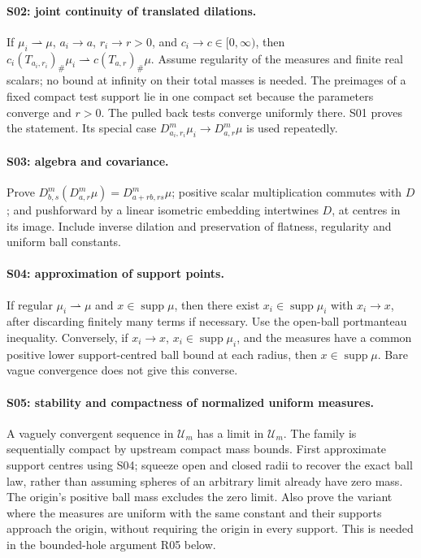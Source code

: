 \paragraph{S02: joint continuity of translated dilations.}
If $\mu_i\rightharpoonup\mu$, $a_i\to a$, $r_i\to r>0$, and
$c_i\to c\in[0,\infty)$, then
$c_i(T_{a_i,r_i})_\#\mu_i\rightharpoonup c(T_{a,r})_\#\mu$.
Assume regularity of the measures and finite real scalars; no bound at infinity
on their total masses is needed. The preimages of a fixed compact test support
lie in one compact set because the parameters converge and $r>0$. The pulled
back tests converge uniformly there. S01 proves the statement. Its special case
$D^m_{a_i,r_i}\mu_i\to D^m_{a,r}\mu$ is used repeatedly.

\paragraph{S03: algebra and covariance.}
Prove
$D^m_{b,s}(D^m_{a,r}\mu)=D^m_{a+rb,rs}\mu$;
positive scalar multiplication commutes with $D$; and pushforward by a linear
isometric embedding intertwines $D$, at centres in its image. Include inverse
dilation and preservation of flatness, regularity and uniform ball constants.

\paragraph{S04: approximation of support points.}
If regular $\mu_i\rightharpoonup\mu$ and $x\in\operatorname{supp}\mu$, then
there exist $x_i\in\operatorname{supp}\mu_i$ with $x_i\to x$, after discarding
finitely many terms if necessary. Use the open-ball portmanteau inequality.
Conversely, if $x_i\to x$, $x_i\in\operatorname{supp}\mu_i$, and the measures
have a common positive lower support-centred ball bound at each radius, then
$x\in\operatorname{supp}\mu$. Bare vague convergence does not give this converse.

\paragraph{S05: stability and compactness of normalized uniform measures.}
A vaguely convergent sequence in $\mathcal U_m$ has a limit in $\mathcal U_m$.
The family is sequentially compact by upstream compact mass bounds.
First approximate support centres using S04; squeeze open and closed radii to
recover the exact ball law, rather than assuming spheres of an arbitrary limit
already have zero mass. The origin's positive ball mass excludes the zero limit.
Also prove the variant where the measures are uniform with the same constant
and their supports approach the origin, without requiring the origin in every
support. This is needed in the bounded-hole argument R05 below.

